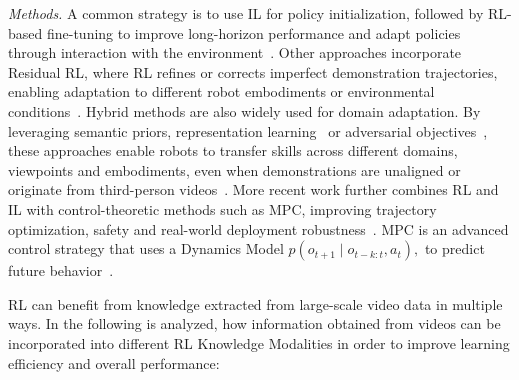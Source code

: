 \textit{Methods.} A common strategy is to use \ac{IL} for policy initialization, followed by RL-based fine-tuning to improve long-horizon performance and adapt policies through interaction with the environment~\cite{Ramachandruni2020AttentiveTS, peng2018sfv}. Other approaches incorporate Residual RL, where \ac{RL} refines or corrects imperfect demonstration trajectories, enabling adaptation to different robot embodiments or environmental conditions~\cite{GarciaHernando2020PhysicsBasedDM}.
Hybrid methods are also widely used for domain adaptation. By leveraging semantic priors, representation learning~\cite{peng2018sfv, Ramachandruni2020AttentiveTS} or adversarial objectives~\cite{GarciaHernando2020PhysicsBasedDM}, these approaches enable robots to transfer skills across different domains, viewpoints and embodiments, even when demonstrations are unaligned or originate from third-person videos~\cite{Stadie2017ThirdPersonIL, Ramachandruni2020AttentiveTS, Pertsch2022CrossDomainTV, Aytar2018PlayingHE}.
More recent work further combines RL and IL with control-theoretic methods such as \acf{MPC}, improving trajectory optimization, safety and real-world deployment robustness~\cite{Huo2023EfficientRS}. \ac{MPC} is an advanced control strategy that uses a Dynamics Model $p(o_{t+1} \mid o_{t-k:t}, a_t),$ to predict future behavior~\cite{Sacks2022LearningTO}.







\ac{RL} can benefit from knowledge extracted from large-scale video data in multiple ways. In the following is analyzed, how information obtained from videos can be incorporated into different RL Knowledge Modalities in order to improve learning efficiency and overall performance:



